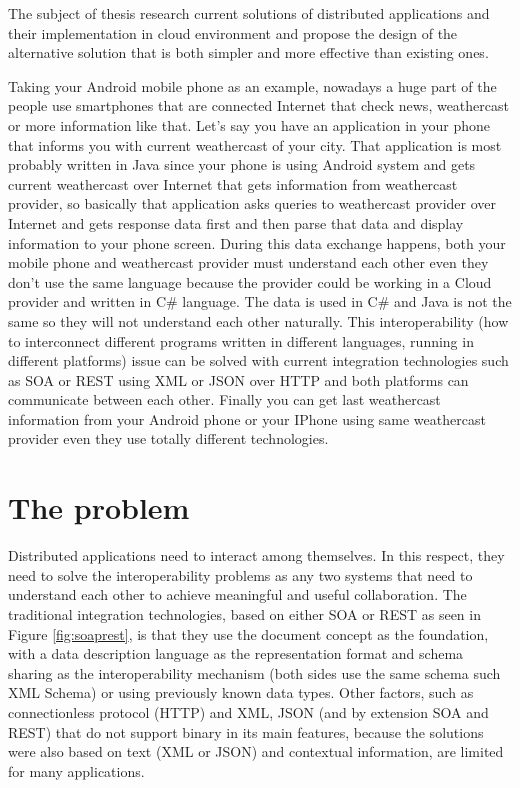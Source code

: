 The subject of thesis research current solutions of distributed applications and their implementation in cloud environment and propose the design of the alternative solution that is both simpler and more effective than existing ones.

Taking your Android mobile phone as an example, nowadays a huge part of the people use smartphones that are connected Internet that check news, weathercast or more information like that. Let’s say you have an application in your phone that informs you with current weathercast of your city. That application is most probably written in Java since your phone is using Android system and gets current weathercast over Internet that gets information from weathercast provider, so basically that application asks queries to weathercast provider over Internet and gets response data first and then parse that data and display information to your phone screen. During this data exchange happens, both your mobile phone and weathercast provider must understand each other even they don’t use the same language because the provider could be working in a Cloud provider and written in C\# language. The data is used in C\# and Java is not the same so they will not understand each other naturally. This interoperability (how to interconnect different programs written in different languages, running in different platforms) issue can be solved with current integration technologies such as SOA or REST using XML or JSON over HTTP and both platforms can communicate between each other. Finally you can get last weathercast information from your Android phone or your IPhone using same weathercast provider even they use totally different technologies.

\section{The problem}
\label{section:problem}

Distributed applications need to interact among themselves. In this respect, they need to solve the interoperability problems as any two systems that need to understand each other to achieve meaningful and useful collaboration. The traditional integration technologies, based on either SOA or REST as seen in Figure \ref{fig:soaprest}, is that they use the document concept as the foundation, with a data description language as the representation format and schema sharing as the interoperability mechanism (both sides use the same schema such XML Schema) or using previously known data types. Other factors, such as connectionless protocol (HTTP) and XML, JSON (and by extension SOA and REST) that do not support binary in its main features, because the solutions were also based on text (XML or JSON) and contextual information, are limited for many applications.

